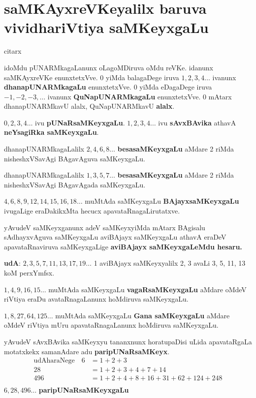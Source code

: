\chapter{saMKAyxreVKeyalilx baruva vividhariVtiya saMKeyxgaLu}
\begin{center}
{citarx}
\end{center}

idoMdu pUNARMkagaLanunx oLagoMDiruva oMdu reVKe. idanunx saMKAyxreVKe enunxtetxVve. 
$0$ yiMda balagaDege iruva $1,2,3,4\ldots$ ivanunx \textbf{dhanapUNARMkagaLu} enunxtetxVve.
$0$ yiMda eDagaDege iruva $-1, -2, -3, \ldots$ ivanunx \textbf{QuNapUNARMkagaLu} enunxtetxVve.
$0$ mAtarx dhanapUNARMkavU alalx, QuNapUNARMkavU \textbf{alalx}.

$0, 2, 3, 4\ldots$ ivu \textbf{pUNaRsaMKeyxgaLu}.
$1, 2, 3, 4\ldots$ ivu \textbf{sAvxBAvika} athavA \textbf{neYsagiRka saMKeyxgaLu}.

dhanapUNARMkagaLalilx $2, 4, 6, 8\ldots$ \textbf{besasaMKeyxgaLu} aMdare {\rm 2} riMda nisheshxVSavAgi BAgavAguva saMKeyxgaLu.

dhanapUNARMkagaLalilx $1, 3, 5, 7\ldots$ \textbf{besasaMKeyxgaLu} aMdare {\rm 2} riMda nisheshxVSavAgi BAgavAgada saMKeyxgaLu.

$4, 6, 8, 9, 12, 14, 15, 16, 18\ldots$ muMtAda saMKeyxgaLu \textbf{BAjayxsaMKeyxgaLu} ivugaLige eraDakikxMta hecucx apavataRnagaLirutatxve.

yAvudeV saMKeyxganunx adeV saMKeyxyiMda mAtarx BAgisalu sAdhayxvAguva saMKeyxgaLu aviBAjayx saMKeyxgaLu athavA eraDeV apavataRnaviruva saMKeyxgaLige \textbf{aviBAjayx saMKeyxgaLeMdu hesaru.}

\textbf{udA}: $2, 3, 5, 7, 11, 13, 17, 19 \ldots$ {\rm 1} aviBAjayx saMKeyxyalilx {\rm 2, 3} avaLi {\-\rm 3, 5}, {\rm 11, 13} koM perxYmfsx.

$1, 4, 9, 16, 15\ldots$ muMtAda saMKeyxgaLu \textbf{vagaRsaMKeyxgaLu} aMdare oMdeV riVtiya eraDu avataRnagaLanunx hoMdiruva saMKeyxgaLu.

$1, 8, 27, 64, 125\ldots$ muMtAda saMKeyxgaLu \textbf{Gana saMKeyxgaLu} aMdare oMdeV riVtiya mUru apavataRnagaLanunx hoMdiruva saMKeyxgaLu.

yAvudeV sAvxBAvika saMKeyxyu tananxnunx horatupaDisi uLida apavataRgaLa motatxkekx samanAdare adu \textbf{paripUNaRsaMKeyx}.
\begin{align*}
\text{udAharaNege}\quad  6 &= 1+2+3\\
28 &= 1+2+3+4+7+14\\
496 &= 1+2+4+8+16+31+62+124+248\\
\end{align*} 
$6,28,496\ldots$ \textbf{paripUNaRsaMKeyxgaLu}

